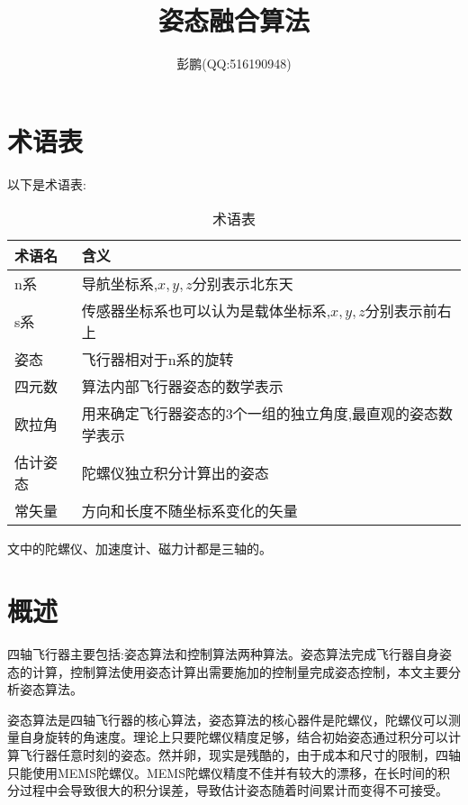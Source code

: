 \documentclass[12pt,a4paper]{article}
\title{姿态融合算法}
\author{彭鹏(QQ:516190948)}
\begin{document}
\maketitle
\newpage
\tableofcontents
\newpage

\section{术语表} 
以下是术语表:
\begin{table}[!hbp]
\begin{center}
    \begin{tabular}{|l|l|}
        \hline
        术语名 & 含义 \\
        \hline
        n系 & 导航坐标系,$x,y,z$分别表示北东天 \\
        \hline
        s系 & 传感器坐标系也可以认为是载体坐标系,$x,y,z$分别表示前右上 \\
        \hline
        姿态 & 飞行器相对于n系的旋转 \\
        \hline
        四元数 & 算法内部飞行器姿态的数学表示 \\
        \hline
        欧拉角 & 用来确定飞行器姿态的3个一组的独立角度,最直观的姿态数学表示 \\
        \hline
        估计姿态 & 陀螺仪独立积分计算出的姿态 \\
        \hline
        常矢量 & 方向和长度不随坐标系变化的矢量 \\
        \hline
    \end{tabular}
    \caption{术语表\label{术语表}}
\end{center}
\end{table}

文中的陀螺仪、加速度计、磁力计都是三轴的。
\newpage

\section{概述}
四轴飞行器主要包括:姿态算法和控制算法两种算法。姿态算法完成飞行器自身姿态的计算，控制算法使用姿态计算出需要施加的控制量完成姿态控制，本文主要分析姿态算法。

姿态算法是四轴飞行器的核心算法，姿态算法的核心器件是陀螺仪，陀螺仪可以测量自身旋转的角速度。理论上只要陀螺仪精度足够，结合初始姿态通过积分可以计算飞行器任意时刻的姿态。然并卵，现实是残酷的，由于成本和尺寸的限制，四轴只能使用MEMS陀螺仪。MEMS陀螺仪精度不佳并有较大的漂移，在长时间的积分过程中会导致很大的积分误差，导致估计姿态随着时间累计而变得不可接受\cite{捷联惯导航}。
\end{document}

